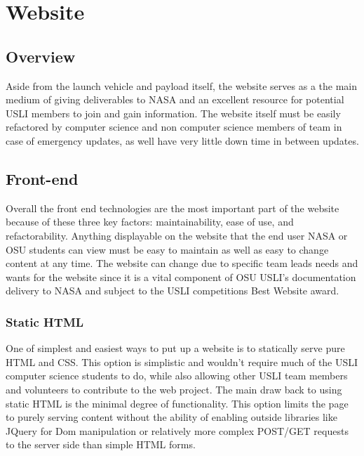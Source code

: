 \documentclass[onecolumn, draftclsnofoot,10pt, compsoc]{IEEEtran}
\begin{document}

\section{Website}
\subsection{Overview}
Aside from the launch vehicle and payload itself, the website serves as a the main medium of giving deliverables to NASA and an excellent resource for potential USLI members to join and gain information. The website itself must be easily refactored by computer science and non computer science members of team in case of emergency updates, as well have very little down time in between updates. 

\subsection{Front-end}
Overall the front end technologies are the most important part of the website because of these three key factors: maintainability, ease of use, and refactorability. Anything displayable on the website that the end user NASA or OSU students can view must be easy to maintain  as well as easy to change content at any time. The website can change due to specific team leads needs and wants for the website since it is a vital component of OSU USLI's documentation delivery to NASA and subject to the USLI competitions Best Website award. 
\subsubsection{Static HTML}
One of simplest and easiest ways to put up a website is to statically serve pure HTML and CSS. This option is simplistic and wouldn't require much of the USLI computer science students to do, while also allowing other USLI team members and volunteers to contribute to the web project. The main draw back to using static HTML is the minimal degree of functionality. This option limits the page to purely serving content without the ability of enabling outside libraries like JQuery for Dom manipulation or relatively more complex POST/GET requests to the server side than simple HTML forms. 
\end{document}
